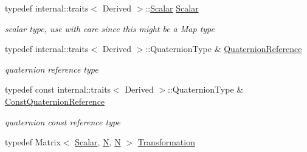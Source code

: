 \begin{DoxyCompactItemize}
\item 
typedef internal\+::traits$<$ Derived $>$\+::\hyperlink{class_sophus_1_1_rx_s_o3_group_base_af4006e7d95216a7e50823a1cd9c9e265}{Scalar} \hyperlink{class_sophus_1_1_rx_s_o3_group_base_af4006e7d95216a7e50823a1cd9c9e265}{Scalar}\hypertarget{class_sophus_1_1_rx_s_o3_group_base_af4006e7d95216a7e50823a1cd9c9e265}{}\label{class_sophus_1_1_rx_s_o3_group_base_af4006e7d95216a7e50823a1cd9c9e265}

\begin{DoxyCompactList}\small\item\em scalar type, use with care since this might be a Map type \end{DoxyCompactList}\item 
typedef internal\+::traits$<$ Derived $>$\+::Quaternion\+Type \& \hyperlink{class_sophus_1_1_rx_s_o3_group_base_a3575bb8e7108073f73835ed59623d94a}{Quaternion\+Reference}\hypertarget{class_sophus_1_1_rx_s_o3_group_base_a3575bb8e7108073f73835ed59623d94a}{}\label{class_sophus_1_1_rx_s_o3_group_base_a3575bb8e7108073f73835ed59623d94a}

\begin{DoxyCompactList}\small\item\em quaternion reference type \end{DoxyCompactList}\item 
typedef const internal\+::traits$<$ Derived $>$\+::Quaternion\+Type \& \hyperlink{class_sophus_1_1_rx_s_o3_group_base_a3f2849c5a1cea4f295be3f149a4eee6d}{Const\+Quaternion\+Reference}\hypertarget{class_sophus_1_1_rx_s_o3_group_base_a3f2849c5a1cea4f295be3f149a4eee6d}{}\label{class_sophus_1_1_rx_s_o3_group_base_a3f2849c5a1cea4f295be3f149a4eee6d}

\begin{DoxyCompactList}\small\item\em quaternion const reference type \end{DoxyCompactList}\item 
typedef Matrix$<$ \hyperlink{class_sophus_1_1_rx_s_o3_group_base_af4006e7d95216a7e50823a1cd9c9e265}{Scalar}, \hyperlink{class_sophus_1_1_rx_s_o3_group_base_ab35c867a7781b1993f12ac6cb2fdf80b}{N}, \hyperlink{class_sophus_1_1_rx_s_o3_group_base_ab35c867a7781b1993f12ac6cb2fdf80b}{N} $>$ \hyperlink{class_sophus_1_1_rx_s_o3_group_base_a60b2d8cd20692d3d39e5e7c729d95145}{Transformation}\hypertarget{class_sophus_1_1_rx_s_o3_group_base_a60b2d8cd20692d3d39e5e7c729d95145}{}\label{class_sophus_1_1_rx_s_o3_group_base_a60b2d8cd20692d3d39e5e7c729d95145}


\end{DoxyCompactItemize}
